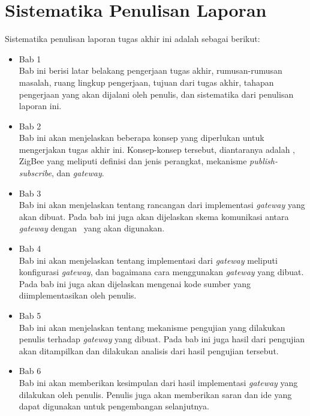 \section{Sistematika Penulisan Laporan}
Sistematika penulisan laporan tugas akhir ini adalah sebagai berikut:
\begin{itemize}
	\item Bab 1 \babSatu \\
	Bab ini berisi latar belakang pengerjaan tugas akhir, rumusan-rumusan masalah, ruang lingkup pengerjaan, tujuan dari tugas akhir, tahapan pengerjaan yang akan dijalani oleh penulis, dan sistematika dari penulisan laporan ini.
	\item Bab 2 \babDua \\
	Bab ini akan menjelaskan beberapa konsep yang diperlukan untuk mengerjakan tugas akhir ini. Konsep-konsep tersebut, diantaranya adalah \iot, ZigBee yang meliputi definisi dan jenis perangkat, mekanisme \textit{publish-subscribe}, dan \textit{gateway}.
	\item Bab 3 \babTiga \\
	Bab ini akan menjelaskan tentang rancangan dari implementasi \textit{gateway} yang akan dibuat. Pada bab ini juga akan dijelaskan skema komunikasi antara \textit{gateway} dengan \plat~yang akan digunakan.
	\item Bab 4 \babEmpat \\
	Bab ini akan menjelaskan tentang implementasi dari \textit{gateway} meliputi konfigurasi \textit{gateway}, dan bagaimana cara menggunakan \textit{gateway} yang dibuat. Pada bab ini juga akan dijelaskan mengenai kode sumber yang diimplementasikan oleh penulis.
	\item Bab 5 \babLima \\
	Bab ini akan menjelaskan tentang mekanisme pengujian yang dilakukan penulis terhadap \textit{gateway} yang dibuat. Pada bab ini juga hasil dari pengujian akan ditampilkan dan dilakukan analisis dari hasil pengujian tersebut.
	\item Bab 6 \kesimpulan \\
	Bab ini akan memberikan kesimpulan dari hasil implementasi \textit{gateway} yang dilakukan oleh penulis. Penulis juga akan memberikan saran dan ide yang dapat digunakan untuk pengembangan selanjutnya.
\end{itemize}

